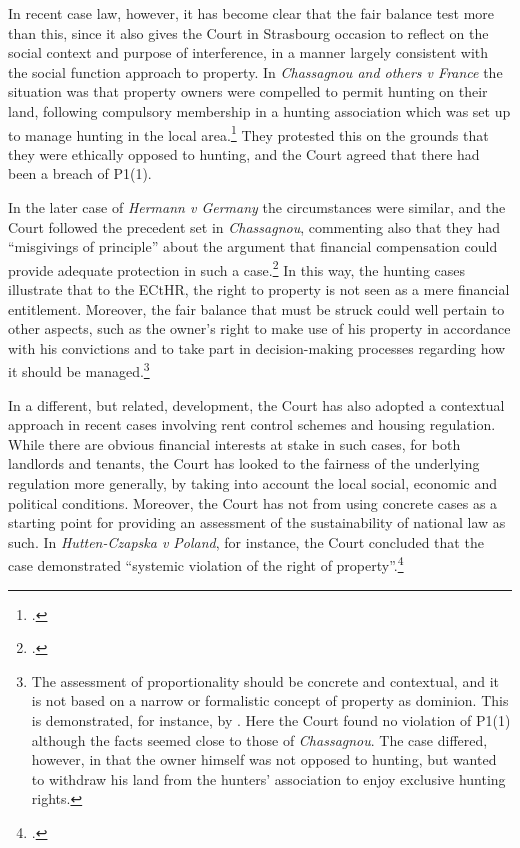 In recent case law, however, it has become clear that the fair balance test  more than this, since it also gives the Court in Strasbourg occasion to reflect on the social context and purpose of interference, in a manner largely consistent with the social function approach to property. In {\it Chassagnou and others v France} the situation was that property owners were compelled to permit hunting on their land, following compulsory membership in a hunting association which was set up to manage hunting in the local area.\footcite{chassagnou99} They protested this on the grounds that they were ethically opposed to hunting, and the Court agreed that there had been a breach of P1(1). 

In the later case of {\it Hermann v Germany} the circumstances were similar, and the Court followed the precedent set in {\it Chassagnou}, commenting also that they had ``misgivings of principle'' about the argument that financial compensation could provide adequate protection in such a case.\footcite[See][91]{hermann12}  In this way, the hunting cases illustrate that to the ECtHR, the right to property is not seen as a mere financial entitlement. Moreover, the fair balance that must be struck could well pertain to other aspects, such as the owner's right to make use of his property in accordance with his convictions and to take part in decision-making processes regarding how it should be managed.\footnote{The assessment of proportionality should be concrete and contextual, and it is not based on a narrow or formalistic concept of property as dominion. This is demonstrated, for instance, by \cite{chabauty12}. Here the Court found no violation of P1(1) although the facts seemed close to those of {\it Chassagnou}. The case differed, however, in that the owner himself was not opposed to hunting, but wanted to withdraw his land from the hunters' association to enjoy exclusive hunting rights.}

In a different, but related, development, the Court has also adopted a contextual approach in recent cases involving rent control 
schemes and housing regulation. While there are obvious financial interests at stake in such cases, for both landlords and tenants, the Court has looked to the fairness of the underlying regulation more generally, by taking into account the local social, economic and political conditions. Moreover, the Court has not  from using concrete cases as a starting point for providing an assessment of the sustainability of national law as such. In {\it Hutten-Czapska v Poland}, for instance, the Court concluded that the case demonstrated ``systemic violation of the right of property''.\footcite[239]{hutten06}

